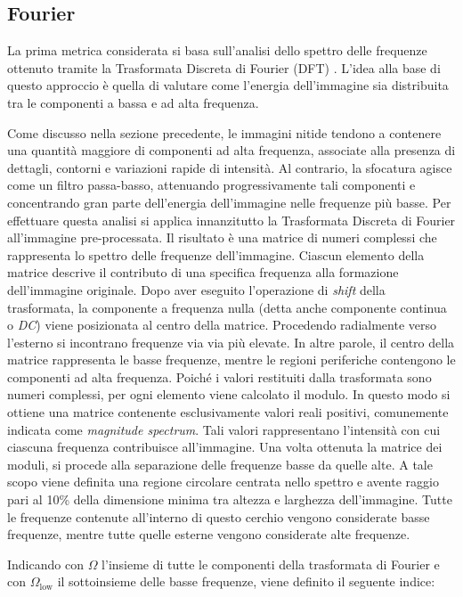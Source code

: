\documentclass[
    target=bach,
    aauheader=,
    style=
]{thud}
\begin{document}
\subsection{Fourier}

La prima metrica considerata si basa sull'analisi dello spettro delle frequenze ottenuto tramite la Trasformata Discreta di Fourier (DFT) \cite{fourier}. L'idea alla base di questo approccio è quella di valutare come l'energia dell'immagine sia distribuita tra le componenti a bassa e ad alta frequenza.

Come discusso nella sezione precedente, le immagini nitide tendono a contenere una quantità maggiore di componenti ad alta frequenza, associate alla presenza di dettagli, contorni e variazioni rapide di intensità. Al contrario, la sfocatura agisce come un filtro passa-basso, attenuando progressivamente tali componenti e concentrando gran parte dell'energia dell'immagine nelle frequenze più basse. Per effettuare questa analisi si applica innanzitutto la Trasformata Discreta di Fourier all'immagine pre-processata. Il risultato è una matrice di numeri complessi che rappresenta lo spettro delle frequenze dell'immagine. Ciascun elemento della matrice descrive il contributo di una specifica frequenza alla formazione dell'immagine originale. Dopo aver eseguito l'operazione di \textit{shift} della trasformata, la componente a frequenza nulla (detta anche componente continua o \textit{DC}) viene posizionata al centro della matrice. Procedendo radialmente verso l'esterno si incontrano frequenze via via più elevate. In altre parole, il centro della matrice rappresenta le basse frequenze, mentre le regioni periferiche contengono le componenti ad alta frequenza. Poiché i valori restituiti dalla trasformata sono numeri complessi, per ogni elemento viene calcolato il modulo. In questo modo si ottiene una matrice contenente esclusivamente valori reali positivi, comunemente indicata come \textit{magnitude spectrum}. Tali valori rappresentano l'intensità con cui ciascuna frequenza contribuisce all'immagine. Una volta ottenuta la matrice dei moduli, si procede alla separazione delle frequenze basse da quelle alte. A tale scopo viene definita una regione circolare centrata nello spettro e avente raggio pari al 10\% della dimensione minima tra altezza e larghezza dell'immagine. Tutte le frequenze contenute all'interno di questo cerchio vengono considerate basse frequenze, mentre tutte quelle esterne vengono considerate alte frequenze.

Indicando con $\Omega$ l'insieme di tutte le componenti della trasformata di Fourier e con $\Omega_{\text{low}}$ il sottoinsieme delle basse frequenze, viene definito il seguente indice:
\end{document}
